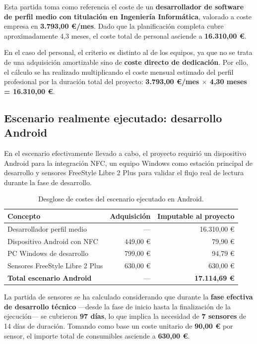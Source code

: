 Esta partida toma como referencia el coste de un \textbf{desarrollador de software de perfil
medio con titulación en Ingeniería Informática}, valorado a coste empresa en
\textbf{3.793,00 \euro{}/mes}. Dado que la planificación completa cubre aproximadamente 4,3
meses, el coste total de personal asciende a \textbf{16.310,00 \euro{}}.

En el caso del personal, el criterio es distinto al de los equipos, ya que no se trata de una
adquisición amortizable sino de \textbf{coste directo de dedicación}. Por ello, el cálculo se ha
realizado multiplicando el coste mensual estimado del perfil profesional por la duración total
del proyecto: \textbf{3.793,00 \euro{}/mes $\times$ 4,30 meses = 16.310,00 \euro{}}.

\subsection{Escenario realmente ejecutado: desarrollo Android}

En el escenario efectivamente llevado a cabo, el proyecto requirió un dispositivo Android para
la integración NFC, un equipo Windows como estación principal de desarrollo y sensores
FreeStyle Libre 2 Plus para validar el flujo real de lectura durante la fase de desarrollo.

\begin{table}[H]
    \centering
    \caption{Desglose de costes del escenario ejecutado en Android.}
    \label{tab:costes-android}
    \begin{tabular}{|p{6.2cm}|r|r|}
        \hline
        \textbf{Concepto} & \textbf{Adquisición} & \textbf{Imputable al proyecto} \\
        \hline
        Desarrollador perfil medio & --- & 16.310,00 \euro{} \\
        \hline
        Dispositivo Android con NFC & 449,00 \euro{} & 79,90 \euro{} \\
        \hline
        PC Windows de desarrollo & 799,00 \euro{} & 94,79 \euro{} \\
        \hline
        Sensores FreeStyle Libre 2 Plus & 630,00 \euro{} & 630,00 \euro{} \\
        \hline
        \textbf{Total escenario Android} & --- & \textbf{17.114,69 \euro{}} \\
        \hline
    \end{tabular}
\end{table}

La partida de sensores se ha calculado considerando que durante la \textbf{fase efectiva de
desarrollo técnico} ---desde la fase de inicio hasta la finalización de la ejecución--- se
cubrieron \textbf{97 días}, lo que implica la necesidad de \textbf{7 sensores} de 14 días de
duración. Tomando como base un coste unitario de \textbf{90,00 \euro{}} por sensor, el importe
total de consumibles asciende a \textbf{630,00 \euro{}}.

